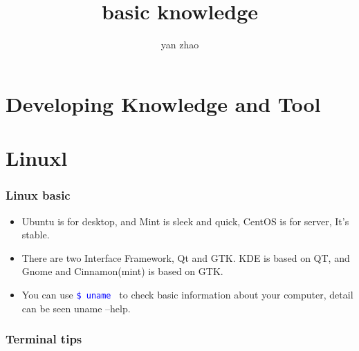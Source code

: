 \documentclass[a4paper,12pt,twoside]{book}
\newcommand{\linuxcommand}[1]{\texttt{\textcolor{blue}{\$ #1 \Pisymbol{psy}{191}}}}
\begin{document}
\title{basic knowledge}
\author{yan zhao}
\date{}\maketitle

\else
\chapter{Developing Knowledge and Tool}
\fi

\chapter{Linuxl}
\subsection{Linux basic}
\begin{itemize}
\item Ubuntu is for desktop, and Mint is sleek and quick, CentOS is for server, It's stable.  \\

\item There are two Interface Framework, Qt and GTK.  KDE is based on QT, and Gnome and Cinnamon(mint) is
based on GTK.  \\

\item You can use \linuxcommand{uname} to check basic information about your computer, detail can be seen uname --help. 
\end{itemize}
\subsection{Terminal tips}
\end{document}
